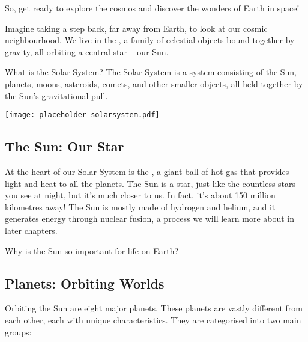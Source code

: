 So, get ready to explore the cosmos and discover the wonders of Earth in space!

\FloatBarrier

Imagine taking a step back, far away from Earth, to look at our cosmic neighbourhood. We live in the , a family of celestial objects bound together by gravity, all orbiting a central star – our Sun.

\begin{keyconcept}{What is the Solar System?}
The Solar System is a system consisting of the Sun, planets, moons, asteroids, comets, and other smaller objects, all held together by the Sun’s gravitational pull.
\end{keyconcept}

\begin{marginfigure}
\texttt{[image: placeholder-solarsystem.pdf]}
\caption{\label{fig:solarsystem}A simplified model of our Solar System. \textit{Image to be added.}}
\end{marginfigure}

\subsection{The Sun: Our Star}

At the heart of our Solar System is the , a giant ball of hot gas that provides light and heat to all the planets.  The Sun is a star, just like the countless stars you see at night, but it's much closer to us. In fact, it’s about 150 million kilometres away!  The Sun is mostly made of hydrogen and helium, and it generates energy through nuclear fusion, a process we will learn more about in later chapters.

\begin{stopandthink}
Why is the Sun so important for life on Earth?
\end{stopandthink}

\subsection{Planets: Orbiting Worlds}

Orbiting the Sun are eight major planets.  These planets are vastly different from each other, each with unique characteristics.  They are categorised into two main groups:

